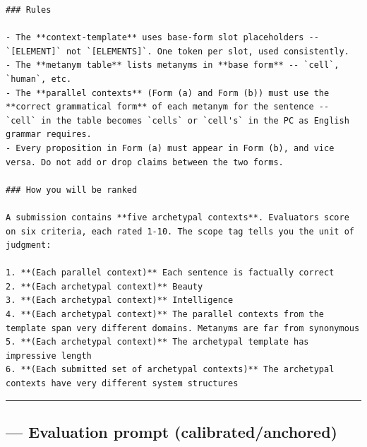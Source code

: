 \documentclass{article}
\begin{document}
\begin{lstlisting}
### Rules

- The **context-template** uses base-form slot placeholders -- `[ELEMENT]` not `[ELEMENTS]`. One token per slot, used consistently.
- The **metanym table** lists metanyms in **base form** -- `cell`, `human`, etc.
- The **parallel contexts** (Form (a) and Form (b)) must use the **correct grammatical form** of each metanym for the sentence -- `cell` in the table becomes `cells` or `cell's` in the PC as English grammar requires.
- Every proposition in Form (a) must appear in Form (b), and vice versa. Do not add or drop claims between the two forms.

### How you will be ranked

A submission contains **five archetypal contexts**. Evaluators score on six criteria, each rated 1-10. The scope tag tells you the unit of judgment:

1. **(Each parallel context)** Each sentence is factually correct
2. **(Each archetypal context)** Beauty
3. **(Each archetypal context)** Intelligence
4. **(Each archetypal context)** The parallel contexts from the template span very different domains. Metanyms are far from synonymous
5. **(Each archetypal context)** The archetypal template has impressive length
6. **(Each submitted set of archetypal contexts)** The archetypal contexts have very different system structures
\end{lstlisting}

\begin{center}\rule{0.5\linewidth}{0.5pt}\end{center}

\subsection{--- Evaluation prompt (calibrated/anchored)}\label{evaluation-prompt-calibratedanchored}
\end{document}

